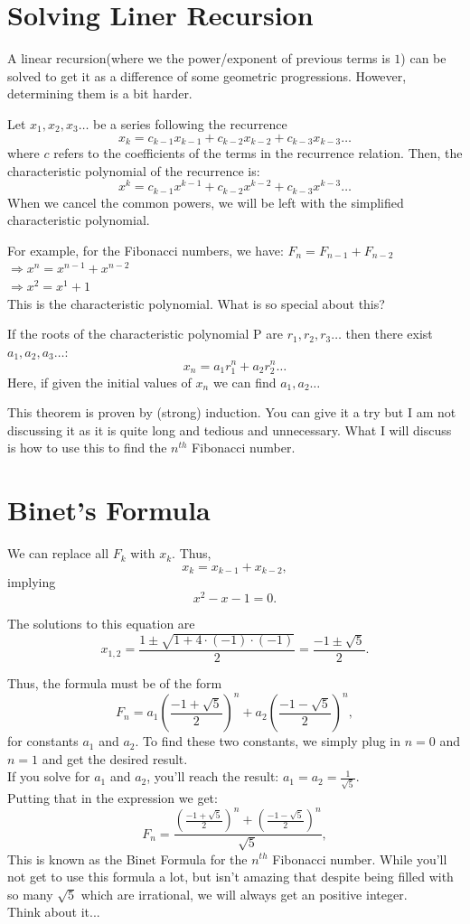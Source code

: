 \section{Solving Liner Recursion}
A linear recursion(where we the power/exponent of previous terms is $1$) can be solved to get it as a difference of some geometric progressions. However, determining them is a bit harder.\\
\begin{definition}
    Let $x_1,x_2,x_3 \dots$ be a series following the recurrence \[x_k=c_{k-1}x_{k-1}+c_{k-2}x_{k-2}+c_{k-3}x_{k-3} \dots\]
 where $c$ refers to the coefficients of the terms in the recurrence relation. Then, the characteristic polynomial of the recurrence is:        \[x^k=c_{k-1}x^{k-1}+c_{k-2}x^{k-2}+c_{k-3}x^{k-3} \dots\]
When we cancel the common powers, we will be left with the simplified characteristic polynomial.
\end{definition}
For example, for the Fibonacci numbers, we have:
$F_n=F_{n-1}+F_{n-2}$\\
$\Rightarrow x^n=x^{n-1}+x^{n-2}$ \\
$\Rightarrow x^2=x^1+1$ \\
This is the characteristic polynomial. What is so special about this?
\begin{theorem}
    If the roots of the characteristic polynomial P are $r_1, r_2, r_3 \dots$ then there exist $a_1, a_2, a_3 \dots$:
\[x_n=a_1r_1^n+a_2r_2^n \dots\]
Here, if given the initial values of $x_n$ we can find $a_1, a_2 \dots$
\end{theorem}
This theorem is proven by (strong) induction. You can give it a try but I am not discussing it as it is quite long and tedious and unnecessary. What I will discuss is how to use this to find the $n^{th}$ Fibonacci number.
\section{Binet's Formula}
We can replace all $F_k$ with $x_k$. Thus,
\[x_k = x_{k-1} + x_{k-2},\]
implying
\[
x^2 - x - 1 = 0.
\]

The solutions to this equation are
\[
x_{1,2} = \frac{1 \pm \sqrt{1 + 4 \cdot (-1) \cdot (-1)}}{2} = \frac{-1 \pm \sqrt{5}}{2}.
\]

Thus, the formula must be of the form
\[
F_n = a_1 \left(\frac{-1 + \sqrt{5}}{2}\right)^n + a_2 \left(\frac{-1 - \sqrt{5}}{2}\right)^n,
\]
for constants $a_1$ and $a_2$. To find these two constants, we simply plug in $n = 0$ and $n = 1$ and get the desired result.
\\
If you solve for $a_1$ and $a_2$, you'll reach the result: $a_1=a_2=\frac{1}{\sqrt5}$.
\\
Putting that in the expression we get:
\[
F_n = \frac{\left(\frac{-1 + \sqrt{5}}{2}\right)^n + \left(\frac{-1 - \sqrt{5}}{2}\right)^n}{\sqrt5},
\]
This is known as the Binet Formula for the $n^{th}$ Fibonacci number. While you'll not get to use this formula a lot, but isn't amazing that despite being filled with so many $\sqrt5$ which are irrational, we will always get an positive integer. \\
Think about it...
